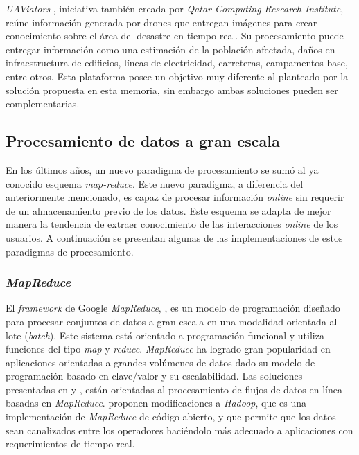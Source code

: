 \textit{UAViators} \citep{UAViators}, iniciativa también creada por \textit{Qatar Computing Research Institute}, reúne información generada por drones que entregan imágenes para crear conocimiento sobre el área del desastre en tiempo real. Su procesamiento puede entregar información como una estimación de la población afectada, daños en infraestructura de edificios, líneas de electricidad, carreteras, campamentos base, entre otros. Esta plataforma posee un objetivo muy diferente al planteado por la solución propuesta en esta memoria, sin embargo ambas soluciones pueden ser complementarias.

\subsection{Procesamiento de datos a gran escala}
\label{arte:SPS}

En los últimos años, un nuevo paradigma de procesamiento se sumó al ya conocido esquema \textit{map-reduce}. Este nuevo paradigma, a diferencia del anteriormente mencionado, es capaz de procesar información \textit{online} sin requerir de un almacenamiento previo de los datos. Este esquema se adapta de mejor manera la tendencia de extraer conocimiento de las interacciones \textit{online} de los usuarios. A continuación se presentan algunas de las implementaciones de estos paradigmas de procesamiento.

\subsubsection*{\textit{MapReduce}}
\label{arte:SPS:mapreduce}

El \textit{framework} de Google \textit{MapReduce}, \citep{DeanMapReduce}, es un modelo de programación diseñado para procesar conjuntos de datos a gran escala en una modalidad orientada al lote (\textit{batch}). Este sistema está orientado a programación funcional y utiliza funciones del tipo \textit{map} y \textit{reduce}. \textit{MapReduce} ha logrado gran popularidad en aplicaciones orientadas a grandes volúmenes de datos dado su modelo de programación basado en clave/valor y su escalabilidad. Las soluciones presentadas en \citep{CondieMapReduce} y \citep{VermaMapReduce}, están orientadas al procesamiento de flujos de datos en línea basadas en \textit{MapReduce}. \citep{CondieMapReduce} proponen modificaciones a \textit{Hadoop}, que es una implementación de \textit{MapReduce} de código abierto, y que permite que los datos sean canalizados entre los operadores haciéndolo más adecuado a aplicaciones con requerimientos de tiempo real. 

